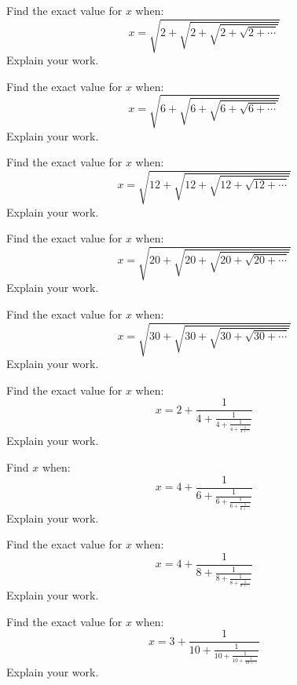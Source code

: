 \item Find the exact value for $x$ when:
\[
x = \sqrt{2+\sqrt{2+\sqrt{2+\sqrt{2+\cdots}}}}
\]
Explain your work.
\item Find the exact value for $x$ when:
\[
x = \sqrt{6+\sqrt{6+\sqrt{6+\sqrt{6+\cdots}}}}
\]
Explain your work.
\item Find the exact value for $x$ when:
\[
x = \sqrt{12+\sqrt{12+\sqrt{12+\sqrt{12+\cdots}}}}
\]
Explain your work.
\item Find the exact value for $x$ when:
\[
x = \sqrt{20+\sqrt{20+\sqrt{20+\sqrt{20+\cdots}}}}
\]
Explain your work.
\item Find the exact value for $x$ when:
\[
x = \sqrt{30+\sqrt{30+\sqrt{30+\sqrt{30+\cdots}}}}
\]
Explain your work.
\item Find the exact value for $x$ when:
\[
  x = 2 + \frac{1}{\displaystyle 4 
          + \frac{1}{\displaystyle 4
          + \frac{1}{\displaystyle 4
          + \frac{1}{\displaystyle 4 +\cdots
}}}}
\]
Explain your work.
\item Find $x$ when:
\[
  x = 4 + \frac{1}{\displaystyle 6
          + \frac{1}{\displaystyle 6
          + \frac{1}{\displaystyle 6
          + \frac{1}{\displaystyle 6 +\cdots
}}}}
\]
Explain your work.
\item Find the exact value for $x$ when:
\[
  x = 4 + \frac{1}{\displaystyle 8 
          + \frac{1}{\displaystyle 8
          + \frac{1}{\displaystyle 8
          + \frac{1}{\displaystyle 8 +\cdots
}}}}
\]
Explain your work.
\item Find the exact value for $x$ when:
\[
  x = 3 + \frac{1}{\displaystyle 10 
          + \frac{1}{\displaystyle 10
          + \frac{1}{\displaystyle 10
          + \frac{1}{\displaystyle 10 +\cdots
}}}}
\]
Explain your work.
